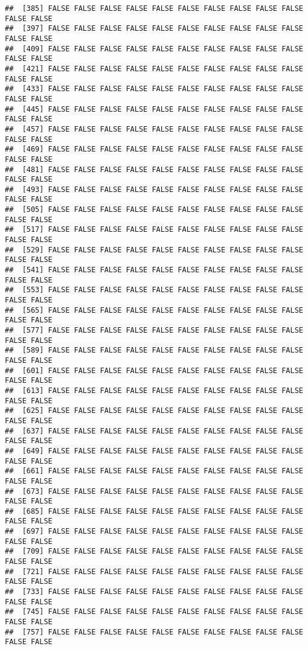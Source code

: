 \documentclass[
]{article}
\begin{document}
\begin{verbatim}
##  [385] FALSE FALSE FALSE FALSE FALSE FALSE FALSE FALSE FALSE FALSE FALSE FALSE
##  [397] FALSE FALSE FALSE FALSE FALSE FALSE FALSE FALSE FALSE FALSE FALSE FALSE
##  [409] FALSE FALSE FALSE FALSE FALSE FALSE FALSE FALSE FALSE FALSE FALSE FALSE
##  [421] FALSE FALSE FALSE FALSE FALSE FALSE FALSE FALSE FALSE FALSE FALSE FALSE
##  [433] FALSE FALSE FALSE FALSE FALSE FALSE FALSE FALSE FALSE FALSE FALSE FALSE
##  [445] FALSE FALSE FALSE FALSE FALSE FALSE FALSE FALSE FALSE FALSE FALSE FALSE
##  [457] FALSE FALSE FALSE FALSE FALSE FALSE FALSE FALSE FALSE FALSE FALSE FALSE
##  [469] FALSE FALSE FALSE FALSE FALSE FALSE FALSE FALSE FALSE FALSE FALSE FALSE
##  [481] FALSE FALSE FALSE FALSE FALSE FALSE FALSE FALSE FALSE FALSE FALSE FALSE
##  [493] FALSE FALSE FALSE FALSE FALSE FALSE FALSE FALSE FALSE FALSE FALSE FALSE
##  [505] FALSE FALSE FALSE FALSE FALSE FALSE FALSE FALSE FALSE FALSE FALSE FALSE
##  [517] FALSE FALSE FALSE FALSE FALSE FALSE FALSE FALSE FALSE FALSE FALSE FALSE
##  [529] FALSE FALSE FALSE FALSE FALSE FALSE FALSE FALSE FALSE FALSE FALSE FALSE
##  [541] FALSE FALSE FALSE FALSE FALSE FALSE FALSE FALSE FALSE FALSE FALSE FALSE
##  [553] FALSE FALSE FALSE FALSE FALSE FALSE FALSE FALSE FALSE FALSE FALSE FALSE
##  [565] FALSE FALSE FALSE FALSE FALSE FALSE FALSE FALSE FALSE FALSE FALSE FALSE
##  [577] FALSE FALSE FALSE FALSE FALSE FALSE FALSE FALSE FALSE FALSE FALSE FALSE
##  [589] FALSE FALSE FALSE FALSE FALSE FALSE FALSE FALSE FALSE FALSE FALSE FALSE
##  [601] FALSE FALSE FALSE FALSE FALSE FALSE FALSE FALSE FALSE FALSE FALSE FALSE
##  [613] FALSE FALSE FALSE FALSE FALSE FALSE FALSE FALSE FALSE FALSE FALSE FALSE
##  [625] FALSE FALSE FALSE FALSE FALSE FALSE FALSE FALSE FALSE FALSE FALSE FALSE
##  [637] FALSE FALSE FALSE FALSE FALSE FALSE FALSE FALSE FALSE FALSE FALSE FALSE
##  [649] FALSE FALSE FALSE FALSE FALSE FALSE FALSE FALSE FALSE FALSE FALSE FALSE
##  [661] FALSE FALSE FALSE FALSE FALSE FALSE FALSE FALSE FALSE FALSE FALSE FALSE
##  [673] FALSE FALSE FALSE FALSE FALSE FALSE FALSE FALSE FALSE FALSE FALSE FALSE
##  [685] FALSE FALSE FALSE FALSE FALSE FALSE FALSE FALSE FALSE FALSE FALSE FALSE
##  [697] FALSE FALSE FALSE FALSE FALSE FALSE FALSE FALSE FALSE FALSE FALSE FALSE
##  [709] FALSE FALSE FALSE FALSE FALSE FALSE FALSE FALSE FALSE FALSE FALSE FALSE
##  [721] FALSE FALSE FALSE FALSE FALSE FALSE FALSE FALSE FALSE FALSE FALSE FALSE
##  [733] FALSE FALSE FALSE FALSE FALSE FALSE FALSE FALSE FALSE FALSE FALSE FALSE
##  [745] FALSE FALSE FALSE FALSE FALSE FALSE FALSE FALSE FALSE FALSE FALSE FALSE
##  [757] FALSE FALSE FALSE FALSE FALSE FALSE FALSE FALSE FALSE FALSE FALSE FALSE

\end{verbatim}
\end{document}
